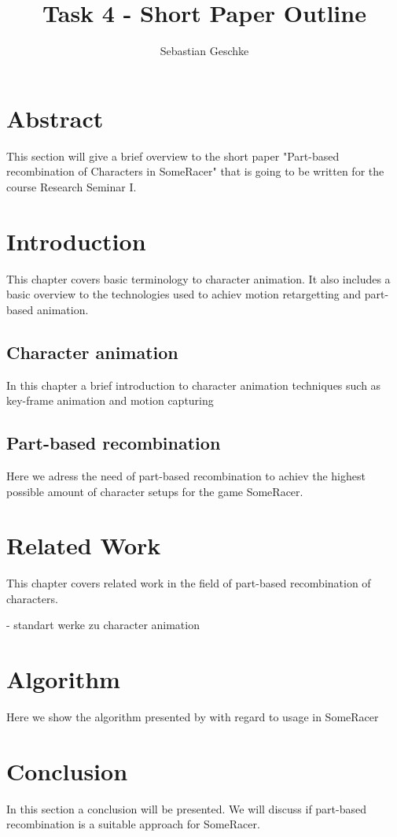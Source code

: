 \documentclass[11pt, a4paper]{article} %
\title{Task 4 - Short Paper Outline}
\author{Sebastian Geschke}
\begin{document}
\maketitle
\section{Abstract}
This section will give a brief overview to the short paper "Part-based recombination of Characters in SomeRacer" that is going to be written for the course Research Seminar I.

\section{Introduction}
This chapter covers basic terminology to character animation. It also includes a basic overview to the technologies used to achiev motion retargetting and part-based animation.

\subsection{Character animation}
In this chapter a brief introduction to character animation techniques such as key-frame animation and motion capturing

\subsection{Part-based recombination}
Here we adress the need of part-based recombination to achiev the highest possible amount of character setups for the game SomeRacer.

\section{Related Work}
This chapter covers related work in the field of part-based recombination of characters.

- standart werke zu character animation


\section{Algorithm}
Here we show the algorithm presented by \citep{jain2012exploring} with regard to usage in SomeRacer

\section{Conclusion}
In this section a conclusion  will be presented. We will discuss if part-based recombination is a suitable approach for SomeRacer.
\nocite{*}



\end{document}
